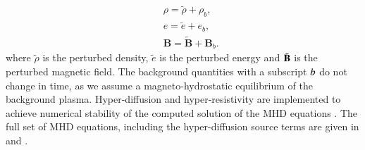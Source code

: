 \documentclass[preprint,authoryear,12pt]{elsarticle}
\begin{document}
\begin{eqnarray}
&& \rho = \tilde{\rho}+\rho_b, \nonumber \\
&& e = \tilde{e}+e_b,  \nonumber \\
&& {\mathbf B} = \tilde{\mathbf B}+{\mathbf B}_b.  \nonumber 
\end{eqnarray}
where $\tilde{\rho}$ is the  perturbed density,  $\tilde{e}$ is the perturbed energy and $\tilde{\bf B}$  is the perturbed magnetic field. The background quantities with a subscript $\it{b}$ do not change in time, as we assume a magneto-hydrostatic equilibrium of the background plasma. Hyper-diffusion and hyper-resistivity are implemented to achieve numerical stability of the computed solution of the MHD equations \citep[see for example][]{Caunt2001}.  The full set of MHD equations, including the hyper-diffusion source terms are given in \citet{Griffiths2015} and \citet{Shelyag2008}.
\end{document}
